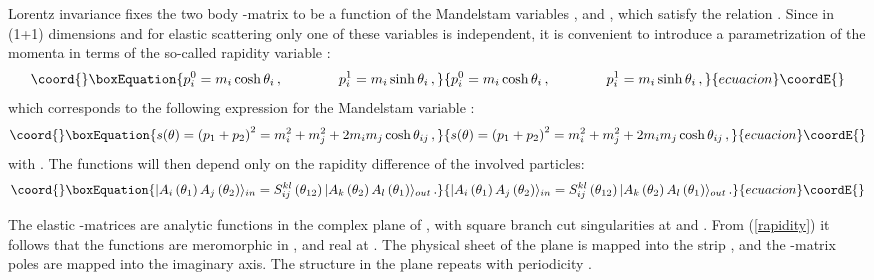 \documentclass[a4paper,12pt]{report}
\begin{document}
Lorentz invariance fixes the two body \coordHE{}-matrix to be a function of the Mandelstam variables
\coordHE{}, \coordHE{} and \coordHE{}, which
satisfy the relation \coordHE{}. Since in (1+1) dimensions and for elastic scattering only
one of these variables is independent, it is convenient to introduce a parametrization of the momenta in terms of
the so-called rapidity variable \myHighlight{$\theta$}\coordHE{}:
\begin{equation}\coord{}\boxEquation{
p_{i}^{0}=m_{i}\cosh\theta_{i}\,,\qquad\qquad p_{i}^{1}=m_{i}\sinh\theta_{i}\,,
}{
p_{i}^{0}=m_{i}\cosh\theta_{i}\,,\qquad\qquad p_{i}^{1}=m_{i}\sinh\theta_{i}\,,
}{ecuacion}\coordE{}\end{equation}
which corresponds to the following expression for the Mandelstam variable \coordHE{}:
\begin{equation}\coord{}\boxEquation{\label{rapidity}
s(\theta)=\left(p_{1}+p_{2}\right)^{2}=m_{i}^{2}+m_{j}^{2}+2m_{i}m_{j}\cosh\theta_{ij}\,,
}{s(\theta)=\left(p_{1}+p_{2}\right)^{2}=m_{i}^{2}+m_{j}^{2}+2m_{i}m_{j}\cosh\theta_{ij}\,,
}{ecuacion}\coordE{}\end{equation}
with \coordHE{}. The functions \coordHE{} will then depend only on the rapidity
difference of the involved particles:
\begin{equation}\coord{}\boxEquation{
|A_{i}\left(\theta_{1}\right)A_{j}\left(\theta_{2}\right)\rangle_{in}=S_{ij}^{kl}\left(\theta_{12}\right)|
A_{k}\left(\theta_{2}\right)A_{l}\left(\theta_{1}\right)\rangle_{out}\,.
}{
|A_{i}\left(\theta_{1}\right)A_{j}\left(\theta_{2}\right)\rangle_{in}=S_{ij}^{kl}\left(\theta_{12}\right)|
A_{k}\left(\theta_{2}\right)A_{l}\left(\theta_{1}\right)\rangle_{out}\,.
}{ecuacion}\coordE{}\end{equation}

The elastic \coordHE{}-matrices are analytic functions in the complex plane of \coordHE{}, with square branch cut singularities
at \coordHE{} and \coordHE{}. From (\ref{rapidity}) it follows that the
functions \coordHE{} are meromorphic in \myHighlight{$\theta$}\coordHE{}, and real at \coordHE{}. The
physical sheet of the \coordHE{} plane is mapped into the strip \coordHE{}, and the \coordHE{}-matrix
poles are mapped into the imaginary axis. The structure in the \myHighlight{$\theta$}\coordHE{} plane repeats with periodicity \coordHE{}.
\end{document}
